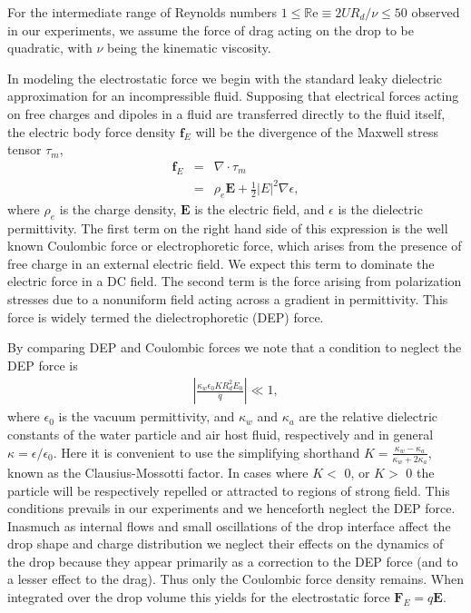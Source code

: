 \documentclass[aip,reprint, floatfix]{revtex4-1}
\begin{document}
For the intermediate range of Reynolds numbers $1 \leq \mathbb{R}\mbox{e} \equiv 2UR_d / \nu \leq 50 $ observed in our experiments, we assume the force of drag acting on the drop to be quadratic, with $\nu$ being the kinematic viscosity.

In modeling the electrostatic force we begin with the standard leaky dielectric approximation for an incompressible fluid. \cite{saville_electrohydrodynamics_1997} Supposing that electrical forces acting on free charges and dipoles in a fluid are transferred directly to the fluid itself, the electric body force density $\mathbf{f}_E$ will be the divergence of the Maxwell stress tensor $\tau_m $,
\begin{eqnarray} \label{e_force}
 \mathbf{f}_E &=& \nabla \cdot \tau_m \nonumber \\ 
 &=& \rho_e \mathbf{E} + \frac{1}{2} \left| E \right|^2 \nabla \epsilon ,
\end{eqnarray}
where $\rho_e$ is the charge density, $\mathbf{E}$ is the electric field, and $\epsilon$ is the dielectric permittivity. The first term on the right hand side of this expression is the well known Coulombic force or electrophoretic force, which arises from the presence of free charge in an external electric field. We expect this term to dominate the electric force in a DC field. The second term is the force arising from polarization stresses due to a nonuniform field acting across a gradient in permittivity. This force is widely termed the dielectrophoretic (DEP) force. 

By comparing DEP and Coulombic forces we note that a condition to neglect the DEP force is
\begin{eqnarray}
\left| \frac{ \kappa_w \epsilon_0 K R_d^2 E_0}{q} \right| \ll 1, \nonumber
\end{eqnarray}
where $\epsilon_0$ is the vacuum permittivity, and $\kappa_w$ and $\kappa_a$ are the relative dielectric constants of the water particle and air host fluid, respectively and in general $\kappa = \epsilon/\epsilon_0$. Here it is convenient to use the simplifying shorthand $K = \frac{\kappa_w - \kappa_a}{\kappa_w + 2 \kappa_a}$, known as the Clausius-Mossotti factor. In cases where $K <$ 0, or $K>$ 0 the particle will be respectively repelled or attracted to regions of strong field. 
This conditions prevails in our experiments and we henceforth neglect the DEP force. Inasmuch as internal flows and small oscillations of the drop interface affect the drop shape and charge distribution we neglect their effects on the dynamics of the drop because they appear primarily as a correction to the DEP force (and to a lesser effect to the drag). Thus only the Coulombic force density remains. When integrated over the drop volume this yields for the electrostatic force $\mathbf{F}_E = q \mathbf{E}$. 
\end{document}
